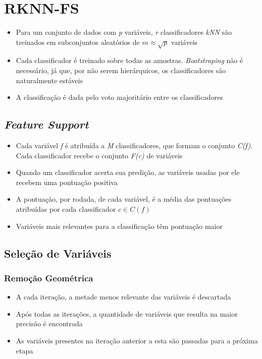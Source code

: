 \section{RKNN-FS}

\begin{frame}
  
\begin{itemize}
    \item Para um conjunto de dados com \textit{p} variáveis, \textit{r} classificadores \textit{kNN} são treinados em subconjuntos aleatórios de $m \approx \sqrt{p}$ variáveis
    \item Cada classificador é treinado sobre todas as amostras. \textit{Bootstraping} não é necessário, já que, por não serem hierárquicos, os classificadores são naturalmente estáveis
    \item A classificação é dada pelo voto majoritário entre os classificadores
\end{itemize}

\end{frame}

\subsection{\textit{Feature Support}}

\begin{frame}

\begin{itemize}
    \item Cada variável \textit{f} é atribuída a \textit{M} classificadores, que formam o conjunto \textit{C(f)}. Cada classificador recebe o conjunto \textit{F(c)} de variáveis
    \item Quando um classificador acerta sua predição, as variáveis usadas por ele recebem uma pontuação positiva
    \item A pontuação, por rodada, de cada variável, é a média das pontuações atribuídas por cada classificador $c \in C(f)$
    \item Variáveis mais relevantes para a classificação têm pontuação maior
\end{itemize}

\end{frame}

\subsection{Seleção de Variáveis}

\begin{frame}
\frametitle{Remoção Geométrica}
\begin{itemize}
    \item A cada iteração, a metade menos relevante das variáveis é descartada
    \item Após todas as iterações, a quantidade de variáveis que resulta na maior precisão é encontrada
    \item As variáveis presentes na iteração anterior a esta são passadas para a próxima etapa
\end{itemize}
\end{frame}

